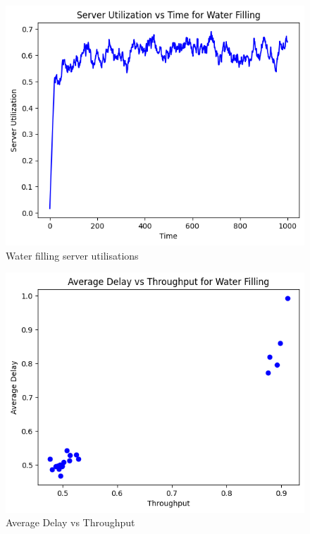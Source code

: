 \documentclass[11pt, a4paper]{article}
\begin{document}
\begin{figure}[H]
     \centering
     \includegraphics[scale=0.5]{fig_3.png}
     \caption{Water filling server utilisations}
\end{figure}

\begin{figure}[H]
     \centering
     \includegraphics[scale=0.5]{fig_4.png}
     \caption{Average Delay vs Throughput}
\end{figure}
\end{document}
